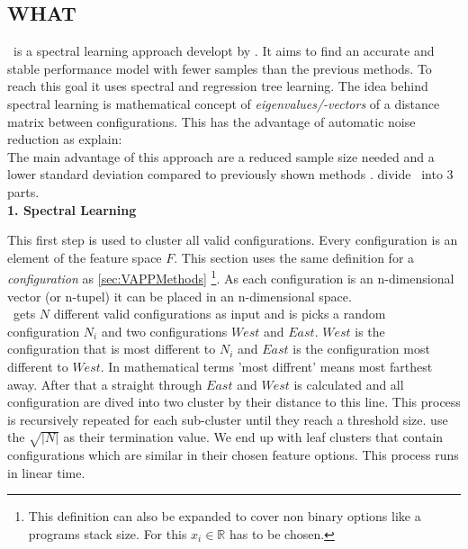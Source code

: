 \subsection{WHAT}\label{sec:WHAT}
\WHAT~is a spectral learning approach developt by \citet{FasterDiscoveryofFasterSystemConfigurationsSiegmund2017}. It aims to find an accurate and stable performance model with fewer samples than the previous methods. To reach this goal it uses spectral and regression tree learning. The idea behind spectral learning is mathematical concept of \textit{eigenvalues/-vectors} of a distance matrix between configurations. This has the advantage of automatic noise reduction as \citet{FasterDiscoveryofFasterSystemConfigurationsSiegmund2017} explain: \\
The main advantage of this approach are a reduced sample size needed and a lower standard deviation compared to previously shown methods \cite{FasterDiscoveryofFasterSystemConfigurationsSiegmund2017}.
\citet{FasterDiscoveryofFasterSystemConfigurationsSiegmund2017} divide \WHAT~into 3 parts.\\

\textbf{1. Spectral Learning}

This first step is used to cluster all valid configurations. Every configuration is an element of the feature space $F$. This section uses the same definition for a \textit{configuration} as \cref{sec:VAPPMethods} \footnote{This definition can also be expanded to cover non binary options like a programs stack size. For this $x_i\in\mathbb{R}$ has to be chosen.}. As each configuration is an n-dimensional vector (or n-tupel) it can be placed in an n-dimensional space.\\
\WHAT~gets $N$ different valid configurations as input and is picks a random configuration $N_i$ and two configurations $West$ and  $East$. $West$ is the configuration that is most different to $N_i$ and $East$ is the configuration most different to $West$. In mathematical terms 'most diffrent' means most farthest away. After that a straight through $East$ and $West$ is calculated and all configuration are dived into two cluster by their distance to this line. This process is recursively repeated for each sub-cluster until they reach a threshold size. \citet{FasterDiscoveryofFasterSystemConfigurationsSiegmund2017} use the $\sqrt{|N|}$ as their termination value. We end up with leaf clusters that contain configurations which are similar in their chosen feature options. This process runs in linear time\cite{FasterDiscoveryofFasterSystemConfigurationsSiegmund2017}.\\

